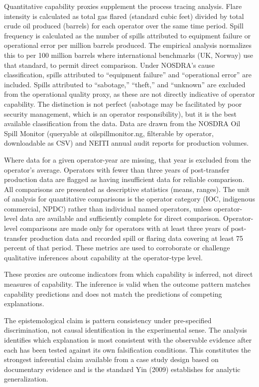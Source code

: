 Quantitative capability proxies supplement the process tracing analysis.
Flare intensity is calculated as total gas flared (standard cubic feet)
divided by total crude oil produced (barrels) for each operator over the
same time period. Spill frequency is calculated as the number of spills
attributed to equipment failure or operational error per million barrels
produced. The empirical analysis normalizes this to per 100 million
barrels where international benchmarks (UK, Norway) use that standard,
to permit direct comparison. Under NOSDRA's cause classification, spills
attributed to ``equipment failure'' and ``operational error'' are
included. Spills attributed to ``sabotage,'' ``theft,'' and ``unknown''
are excluded from the operational quality proxy, as these are not
directly indicative of operator capability. The distinction is not
perfect (sabotage may be facilitated by poor security management, which
is an operator responsibility), but it is the best available
classification from the data. Data are drawn from the NOSDRA Oil Spill
Monitor (queryable at oilspillmonitor.ng, filterable by operator,
downloadable as CSV) and NEITI annual audit reports for production
volumes.

Where data for a given operator-year are missing, that year is excluded
from the operator's average. Operators with fewer than three years of
post-transfer production data are flagged as having insufficient data
for reliable comparison. All comparisons are presented as descriptive
statistics (means, ranges). The unit of analysis for quantitative
comparisons is the operator category (IOC, indigenous commercial, NPDC)
rather than individual named operators, unless operator-level data are
available and sufficiently complete for direct comparison.
Operator-level comparisons are made only for operators with at least
three years of post-transfer production data and recorded spill or
flaring data covering at least 75 percent of that period. These metrics
are used to corroborate or challenge qualitative inferences about
capability at the operator-type level.

These proxies are outcome indicators from which capability is inferred,
not direct measures of capability. The inference is valid when the
outcome pattern matches capability predictions and does not match the
predictions of competing explanations.

The epistemological claim is pattern consistency under pre-specified
discrimination, not causal identification in the experimental sense. The
analysis identifies which explanation is most consistent with the
observable evidence after each has been tested against its own
falsification conditions. This constitutes the strongest inferential
claim available from a case study design based on documentary evidence
and is the standard Yin (2009) establishes for analytic generalization.


